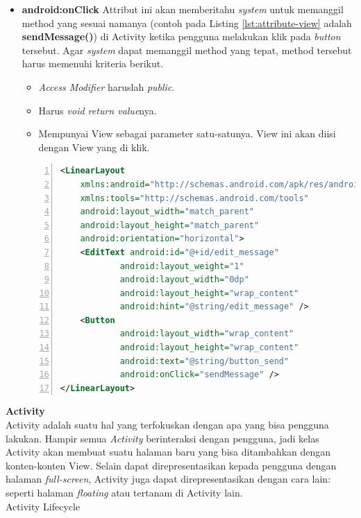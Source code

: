 \documentclass[a4paper,twoside]{article}
\begin{document}
\begin{enumerate}
\begin{itemize}
	\item \textbf{android:onClick}
	Attribut ini akan memberitahu \textit{system} untuk memanggil method yang sesuai namanya (contoh pada Listing \ref{lst:attribute-view} adalah \textbf{sendMessage()}) di Activity ketika pengguna melakukan klik pada \textit{button} tersebut. Agar \textit{system} dapat memanggil method yang tepat, method tersebut harus memenuhi kriteria berikut.
	\begin{itemize}
		\item \textit{Access Modifier} haruslah \textit{public}.
		\item Harus \textit{void return value}nya.
		\item Mempunyai View sebagai parameter satu-satunya. View ini akan diisi dengan View yang di klik.
	\end{itemize}
\begin{lstlisting}[language=xml,numbers=left,breaklines=true,caption={Contoh kode file XML pada folder layout},label={lst:attribute-view},language=xml]
<LinearLayout
	xmlns:android="http://schemas.android.com/apk/res/android"
	xmlns:tools="http://schemas.android.com/tools"
	android:layout_width="match_parent"
	android:layout_height="match_parent"
	android:orientation="horizontal">
	<EditText android:id="@+id/edit_message"
			android:layout_weight="1"
			android:layout_width="0dp"
			android:layout_height="wrap_content"
			android:hint="@string/edit_message" />
	<Button
			android:layout_width="wrap_content"
			android:layout_height="wrap_content"
			android:text="@string/button_send"
			android:onClick="sendMessage" />
</LinearLayout>
\end{lstlisting}
\end{itemize}


\textbf{Activity}\\

\label{sec:activity}
\cite{android_developers}
Activity adalah suatu hal yang terfokuskan dengan apa yang bisa pengguna lakukan. Hampir semua \textit{Activity} berinteraksi dengan pengguna, jadi kelas Activity akan membuat suatu halaman baru yang bisa ditambahkan dengan konten-konten View. Selain dapat direpresentasikan kepada pengguna dengan halaman \textit{full-screen}, Activity juga dapat direpresentasikan dengan cara lain: seperti halaman \textit{floating} atau tertanam di Activity lain.\\

Activity Lifecycle\\


\end{enumerate}
\end{document}
